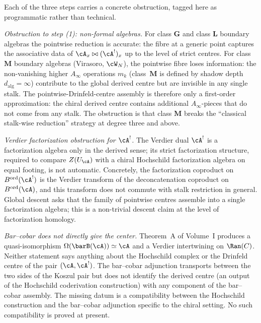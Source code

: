 \begin{remark}
\label{rem:drinfeld-center-obstructions}
Each of the three steps carries a concrete obstruction, tagged here as
programmatic rather than technical.

\emph{Obstruction to step (1): non-formal algebras.}
For class $\mathbf{G}$ and class $\mathbf{L}$ boundary algebras the
pointwise reduction is accurate: the fibre at a generic point captures
the associative data of $\cA_x \bowtie (\cA^!)_x$ up to the level of
strict centres. For class $\mathbf{M}$ boundary algebras (Virasoro,
$\cW_N$), the pointwise fibre loses information: the non-vanishing
higher $A_\infty$ operations $m_k$ (class~$\mathbf{M}$ is defined by
shadow depth $d_{\mathrm{alg}} = \infty$) contribute to the global
derived centre but are invisible in any single stalk. The
pointwise-Drinfeld-centre assembly is therefore only a first-order
approximation: the chiral derived centre contains additional
$A_\infty$-pieces that do not come from any stalk. The obstruction is
that class $\mathbf{M}$ breaks the ``classical stalk-wise reduction''
strategy at degree three and above.

\emph{Verdier factorization obstruction for \(\cA^!\).}
The Verdier dual $\cA^!$ is a factorization algebra only in the derived
sense; its strict factorization structure, required to compare
$Z(U_\cA)$ with a chiral Hochschild factorization algebra on equal
footing, is not automatic. Concretely, the factorization coproduct on
$B^{\mathrm{ord}}(\cA^!)$ is the Verdier transform of the deconcatenation
coproduct on $B^{\mathrm{ord}}(\cA)$, and this transform does not commute with stalk restriction
in general. Global descent asks that the family of pointwise
centres assemble into a single factorization algebra; this is a
non-trivial descent claim at the level of factorization homology.

\emph{Bar--cobar does not directly give the
center.}
Theorem~A of Volume~I produces a quasi-isomorphism
$\Omega(\barB(\cA)) \simeq \cA$ and a Verdier intertwining on
$\Ran(C)$. Neither statement says anything about the Hochschild complex
or the Drinfeld centre of the pair $(\cA, \cA^!)$. The bar--cobar
adjunction transports between the two sides of the Koszul pair but does
not identify the derived centre (an output of the Hochschild
coderivation construction) with any component of the bar--cobar
assembly. The missing datum is
a compatibility between the
Hochschild construction and the bar--cobar adjunction specific to the chiral
setting. No such compatibility is proved at present.
\end{remark}

